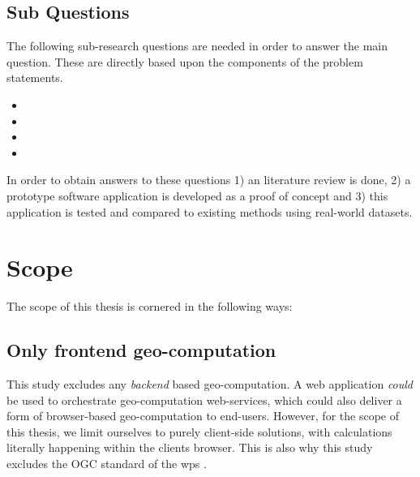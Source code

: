 \subsection*{Sub Questions}
The following sub-research questions are needed in order to answer the main question.
These are directly based upon the components of the problem statements. 
\begin{itemize}[-]
  \item \mySubRQOne
  \item \mySubRQTwo
  \item \mySubRQThree
  \item \mySubRQFour
\end{itemize}
In order to obtain answers to these questions 
1) an literature review is done, 
2) a prototype software application is developed as a proof of concept and 
3) this application is tested and compared to existing methods using real-world datasets.




\newpage
\section{Scope}
The scope of this thesis is cornered in the following ways: 

\subsection*{Only frontend geo-computation}
This study excludes any \emph {backend} based geo-computation.
A web application \textit{could} be used to orchestrate geo-computation web-services, which could also deliver a form of browser-based geo-computation to end-users. 
However, for the scope of this thesis, we limit ourselves to purely client-side solutions, with calculations literally happening within the clients browser. 
This is also why this study excludes the OGC standard of the \ac{wps} \cite{ogc_web_2015}.

